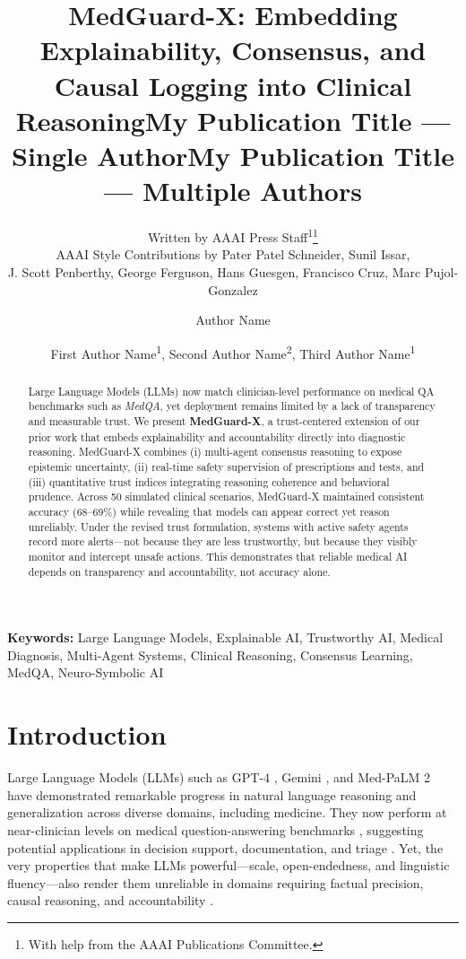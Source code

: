 \documentclass[letterpaper]{article} %
\title{MedGuard-X: Embedding Explainability, Consensus, and Causal Logging into Clinical Reasoning}
\author{
    Written by AAAI Press Staff\textsuperscript{\rm 1}\thanks{With help from the AAAI Publications Committee.}\\
    AAAI Style Contributions by Pater Patel Schneider,
    Sunil Issar,\\
    J. Scott Penberthy,
    George Ferguson,
    Hans Guesgen,
    Francisco Cruz\equalcontrib,
    Marc Pujol-Gonzalez\equalcontrib
}
\title{My Publication Title --- Single Author}
\author {
    Author Name
}
\title{My Publication Title --- Multiple Authors}
\author {
    First Author Name\textsuperscript{\rm 1},
    Second Author Name\textsuperscript{\rm 2},
    Third Author Name\textsuperscript{\rm 1}
}
\begin{document}
\maketitle

\begin{abstract}
Large Language Models (LLMs) now match clinician-level performance on medical QA benchmarks such as \textit{MedQA}, yet deployment remains limited by a lack of transparency and measurable trust. We present \textbf{MedGuard-X}, a trust-centered extension of our prior work that embeds explainability and accountability directly into diagnostic reasoning. MedGuard-X combines (i) multi-agent consensus reasoning to expose epistemic uncertainty, (ii) real-time safety supervision of prescriptions and tests, and (iii) quantitative trust indices integrating reasoning coherence and behavioral prudence. Across 50 simulated clinical scenarios, MedGuard-X maintained consistent accuracy (68–69\%) while revealing that models can appear correct yet reason unreliably. 
Under the revised trust formulation, systems with active safety agents record more alerts—not because they are less trustworthy, but because they visibly monitor and intercept unsafe actions. 
This demonstrates that reliable medical AI depends on transparency and accountability, not accuracy alone.

\end{abstract}



\textbf{Keywords:} Large Language Models, Explainable AI, Trustworthy AI, Medical Diagnosis, Multi-Agent Systems, Clinical Reasoning, Consensus Learning, MedQA, Neuro-Symbolic AI

\section{Introduction}

Large Language Models (LLMs) such as GPT-4 \cite{achiam2023gpt}, Gemini \cite{team2023gemini}, and Med-PaLM 2 \cite{singhal2025toward} have demonstrated remarkable progress in natural language reasoning and generalization across diverse domains, including medicine. They now perform at near-clinician levels on medical question-answering benchmarks \cite{kung2023performance,nori2023capabilities}, suggesting potential applications in decision support, documentation, and triage \cite{lee2023benefits}. Yet, the very properties that make LLMs powerful—scale, open-endedness, and linguistic fluency—also render them unreliable in domains requiring factual precision, causal reasoning, and accountability \cite{ji2023survey,begoli2019need}.
\end{document}
